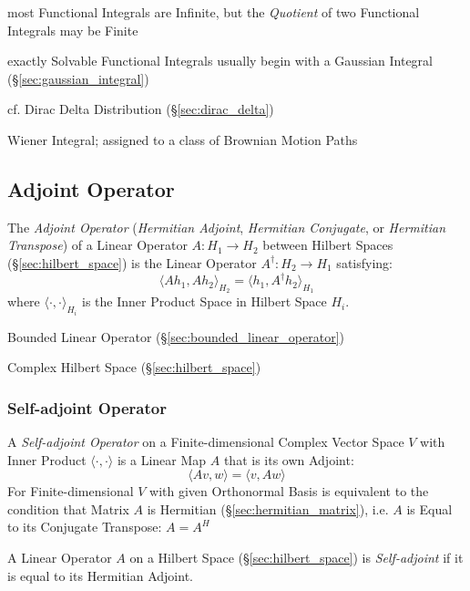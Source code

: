 most Functional Integrals are Infinite, but the \emph{Quotient} of two
Functional Integrals may be Finite

exactly Solvable Functional Integrals usually begin with a Gaussian Integral
(\S\ref{sec:gaussian_integral})

cf. Dirac Delta Distribution (\S\ref{sec:dirac_delta})

Wiener Integral; assigned to a class of Brownian Motion Paths



\subsection{Adjoint Operator}\label{sec:adjoint_operator}

The \emph{Adjoint Operator} (\emph{Hermitian Adjoint}, \emph{Hermitian
  Conjugate}, or \emph{Hermitian Transpose}) of a Linear Operator $A : H_1
\rightarrow H_2$ between Hilbert Spaces (\S\ref{sec:hilbert_space}) is the
Linear Operator $A^\dag : H_2 \rightarrow H_1$ satisfying:
\[
  \langle{Ah_1,Ah_2}\rangle_{H_2} = \langle{h_1,A^{\dag}h_2}\rangle_{H_1}
\]
where $\langle\cdot,\cdot\rangle_{H_i}$ is the Inner Product Space in Hilbert
Space $H_i$.


Bounded Linear Operator (\S\ref{sec:bounded_linear_operator})

Complex Hilbert Space (\S\ref{sec:hilbert_space})



\subsubsection{Self-adjoint Operator}\label{sec:self_adjoint_operator}

A \emph{Self-adjoint Operator} on a Finite-dimensional Complex Vector Space $V$
with Inner Product $\langle{\cdot, \cdot}\rangle$ is a Linear Map $A$ that is
its own Adjoint:
\[
  \langle{Av,w}\rangle = \langle{v,Aw}\rangle
\]
For Finite-dimensional $V$ with given Orthonormal Basis is equivalent to the
condition that Matrix $A$ is Hermitian (\S\ref{sec:hermitian_matrix}), i.e. $A$
is Equal to its Conjugate Transpose: $A = A^H$

A Linear Operator $A$ on a Hilbert Space (\S\ref{sec:hilbert_space}) is
\emph{Self-adjoint} if it is equal to its Hermitian Adjoint.

